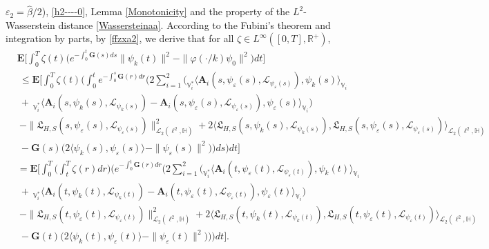 \documentclass[11pt]{article}
\renewcommand{\leq}{\leqslant}
\numberwithin{equation}{section}
\begin{document}
$\varepsilon_2=\widehat{\beta}/2$), \eqref{h2----0}, Lemma \ref{Monotonicity} and the  property of the
$L^2$-Wasserstein distance \eqref{Wassersteinaa}.
According to the Fubini's theorem and
integration by parts, by \eqref{ffzxa2}, we derive that for all $\zeta\in L^\infty([0,T],\mathbb{R}^+)$,
	\begin{align}&\label{ffzrrrgggxa2}		\mathbf{E}\Bigg[\int_0^{T}
\zeta(t)\Bigg(
		e^{-\int_0^{t}
\mathbf{G}(s)ds}
		\|\psi_{k}(t)
\|^2-
		\|\varphi(\cdot/k)\psi_0\|^2\Bigg)dt\Bigg]
		\nonumber\\&\  \leq
		\mathbf{E}\Bigg[\int_0^{T} \zeta(t)
\Bigg(
		\int_0^{t}
e^{-\int_0^s\mathbf{G}(r)dr} \Bigg( 2\sum_{i=1}^2\Big( _{\mathbb{V}_i^*}
		\langle \mathbf{A}_i(s,
\psi_\varepsilon(s),
\mathcal{L}_{\psi_\varepsilon(s)}) ,\psi_k(s)\rangle_{\mathbb{V}_i}
\nonumber\\&\  	+\ _{\mathbb{V}_i^*}
		\langle \mathbf{A}_i(s,\psi_k(s),\mathcal{L}_{\psi_k(s)})
-\mathbf{A}_i(s,\psi_\varepsilon(s),
\mathcal{L}_{\psi_\varepsilon(s)}) ,\psi_\varepsilon(s)\rangle_{\mathbb{V}_i}\Big)
		\nonumber\\&\    -\|\mathfrak{L}_{H,S}(s,\psi_\varepsilon(s),
\mathcal{L}_{\psi_\varepsilon(s)})
		\|^2_{\mathcal{L}_2(\ell^2,
			\mathbb{H})}
		+2 \langle  \mathfrak{L}_{H,S}(s,\psi_k(s),
\mathcal{L}_{\psi_k(s)})
		, \mathfrak{L}_{H,S}(s,\psi_\varepsilon(s),
\mathcal{L}_{\psi_\varepsilon(s)})
		\rangle_{\mathcal{L}_2(\ell^2,
			\mathbb{H})}
		\nonumber\\&\    -
		\mathbf{G}(s) \Big(2\langle \psi_k(s)
		, \psi_\varepsilon(s)
		\rangle-
		\|\psi_\varepsilon(s)\|^2
		\Big)
		\Bigg)ds\Bigg)dt\Bigg]
\nonumber\\&=
		\mathbf{E}\Bigg[\int_0^{T} \Bigg(\int_{t}^{T}\zeta(r)dr\Bigg)
\Bigg(e^{-\int_0^{t}\mathbf{G}(r)dr} \Bigg(   2\sum_{i=1}^2\Big( _{\mathbb{V}_i^*}
		\langle \mathbf{A}_i(t,
\psi_\varepsilon(t),\mathcal{L}_{
\psi_\varepsilon(t)}) ,\psi_k(t)\rangle_{\mathbb{V}_i}
\nonumber\\&\  +\ _{\mathbb{V}^*_i}
		\langle \mathbf{A}_i(t,\psi_k(t),\mathcal{L}_{\psi_k(t)})
-\mathbf{A}_i(t,\psi_\varepsilon(t),
\mathcal{L}_{\psi_\varepsilon(t)}) ,\psi_\varepsilon(t)\rangle_{\mathbb{V}_i}\Big)
		\nonumber\\&\   -\|\mathfrak{L}_{H,S}(t,\psi_\varepsilon(t),
\mathcal{L}_{\psi_\varepsilon(t)})
		\|^2_{\mathcal{L}_2(\ell^2,
			\mathbb{H})}
		+2 \langle  \mathfrak{L}_{H,S}(t,\psi_k(t),
\mathcal{L}_{\psi_k(t)})
		, \mathfrak{L}_{H,S}(t,\psi_\varepsilon(t),
\mathcal{L}_{\psi_\varepsilon(t)})
		\rangle_{\mathcal{L}_2(\ell^2,
			\mathbb{H})}
		\nonumber\\&\    -
		\mathbf{G}(t)\Big(2\langle \psi_k(t)
		, \psi_\varepsilon(t)
		\rangle-
		\|\psi_\varepsilon(t)\|^2
		\Big)
		\Bigg)\Bigg)dt\Bigg].
	\end{align}
\end{document}
